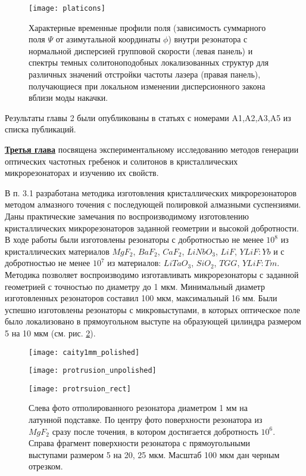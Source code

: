 \begin{figure}
  \centering
  \texttt{[image: platicons]}
  \caption{Характерные временные профили поля (зависимость суммарного поля $\Psi$ от азимутальной координаты $\phi$) внутри резонатора с нормальной дисперсией групповой скорости (левая панель) и спектры темных солитоноподобных локализованных структур для различных значений отстройки частоты лазера (правая панель), получающиеся при локальном изменении дисперсионного закона вблизи моды накачки.}
  \label{platicons}
\end{figure}

Результаты главы 2 были опубликованы в статьях с номерами A1,A2,A3,A5 из списка публикаций.

\underline{\textbf{Третья глава}} посвящена экспериментальному исследованию методов генерации оптических частотных гребенок и солитонов в кристаллических микрорезонаторах и изучению их свойств.

В п. 3.1 разработана методика изготовления кристаллических микрорезонаторов методом алмазного точения с последующей полировкой алмазными суспензиями. Даны практические замечания по воспроизводимому изготовлению кристаллических микрорезонаторов заданной геометрии и высокой добротности. В ходе работы были изготовлены резонаторы с добротностью не менее $10^8$ из кристаллических материалов $MgF_2$, $BaF_2$, $CaF_2$, $LiNbO_3$, $LiF$, $YLiF:Yb$ и с добротностью не менее $10^7$ из материалов: $LiTaO_3$, $SiO_2$, $TGG$, $YLiF:Tm$. Методика позволяет воспроизводимо изготавливать микрорезонаторы с заданной геометрией с точностью по диаметру до 1 мкм. Минимальный диаметр изготовленных резонаторов составил 100 мкм, максимальный 16 мм. Были успешно изготовлены резонаторы с микровыступами, в которых оптическое поле было локализовано в прямоугольном выступе на образующей цилиндра размером 5 на 10 мкм (см. рис. \ref{cavity_polished}).

\begin{figure}[ht]
  \begin{minipage}[ht]{0.32\linewidth}\centering
    \texttt{[image: caity1mm\_polished]}
  \end{minipage}
  \hfill
  \begin{minipage}[ht]{0.32\linewidth}\centering
    \texttt{[image: protrusion\_unpolished]}
  \end{minipage}
  \hfill
  \begin{minipage}[ht]{0.32\linewidth}\centering
    \texttt{[image: protrsuion\_rect]}
  \end{minipage}
  \caption{Слева фото отполированного резонатора диаметром 1 мм на латунной подставке. По центру фото поверхности резонатора из $MgF_2$ сразу после точения, в котором достигается добротность $10^6$. Справа фрагмент поверхности резонатора с прямоугольными выступами размером 5 на 20, 25 мкм. Масштаб 100 мкм дан черным отрезком.}
  \label{cavity_polished}
\end{figure}

